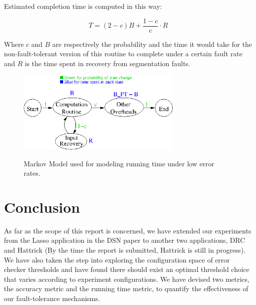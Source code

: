 \documentclass{article}
\begin{document}
Estimated completion time is computed in this way:

\[
T=(2-c) B + \frac{1-c}{c} \cdot R
\]

Where $c$ and $B$ are respectively the probability and the time it would take for the non-fault-tolerant version of this routine to complete under a certain fault rate and $R$ is the time spent in recovery from segmentation faults.

\begin{figure}
\includegraphics[width=8cm,natwidth=488,natheight=243]{model1.png}
\label{markovModel}
\caption{Markov Model used for modeling running time under low error rates.}
\end{figure}

\section{Conclusion}

As far as the scope of this report is concerned, we have extended our experiments from the Lasso application in the DSN paper to another two applications, DRC and Hattrick (By the time the report is submitted, Hattrick is still in progress). We have also taken the step into exploring the configuration space of error checker thresholds and have found there should exist an optimal threshold choice that varies according to experiment configurations. We have devised two metrics, the accuracy metric and the running time metric, to quantify the effectiveness of our fault-tolerance mechanisms.


\nocite{5764677}
\nocite{Rinard:2006:PAB:1183401.1183447}
\nocite{deKruijf:2010:RAF:1816038.1816026}
\nocite{deKruijf:2010:RAF:1815961.1816026}
\nocite{Riesen:2011:SAR:2238436.2238466}
\nocite{1386657}
\nocite{journals/ijhpca/CappelloGGKKS09}
\nocite{Restrepo-Calle:2010:CIF:1811212.1811218}
\nocite{6264672}
\nocite{deKruijf:2011:IPA:2155620.2155637}
\nocite{Baek10green:a}
\nocite{Hoffmann:2011:DKR:1961295.1950390}
\nocite{Chan:2009:AMP:1654059.1654065}
\nocite{Cui:2012:EPO:2355585.2355587}
\nocite{1402092}
\nocite{deKruijf:2012:SAC:2345156.2254120}
\nocite{Abadi:2009:CIP:1609956.1609960}
\nocite{Reis:2005:SFT:1113841.1113843}
\nocite{lee2011sef}
\nocite{6012845}
\end{document}
